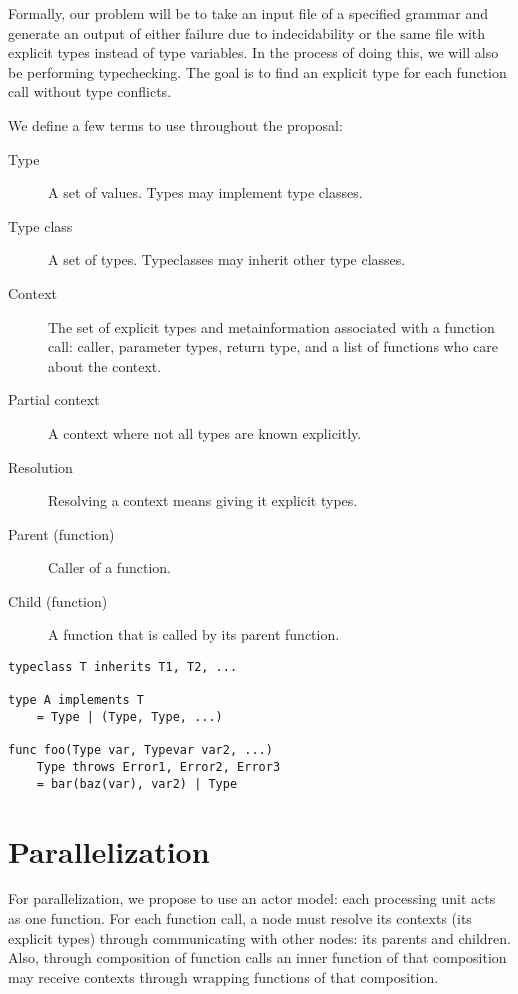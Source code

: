 \documentclass{acm_proc_article-sp}
\begin{document}

Formally, our problem will be to take an input file of a specified grammar and
generate an output of either failure due to indecidability or the same file
with explicit types instead of type variables. In the process of doing this, we
will also be performing typechecking. The goal is to find an explicit type for
each function call without type conflicts.

We define a few terms to use throughout the proposal:
\begin{description}
	\item[Type] A set of values. Types may implement type classes.
	\item[Type class] A set of types. Typeclasses may inherit other type classes.
	\item[Context] The set of explicit types and metainformation associated
		with a function call: caller, parameter types, return type,
		and a list of functions who care about the context.
	\item[Partial context] A context where not all types are known explicitly.
	\item[Resolution] Resolving a context means giving it explicit types.
	\item[Parent (function)] Caller of a function.
	\item[Child (function)] A function that is called by its parent function.
\end{description}

\begin{lstlisting}[caption=Grammar displayed informally,style=paratype]
typeclass T inherits T1, T2, ...

type A implements T
    = Type | (Type, Type, ...)

func foo(Type var, Typevar var2, ...)
    Type throws Error1, Error2, Error3
    = bar(baz(var), var2) | Type
\end{lstlisting}

\section{Parallelization}

For parallelization, we propose to use an actor model: each processing unit
acts as one function. For each function call, a node must resolve its contexts
(its explicit types) through communicating with other nodes: its parents and
children. Also, through composition of function calls an inner function of that
composition may receive contexts through wrapping functions of that
composition.
\end{document}
